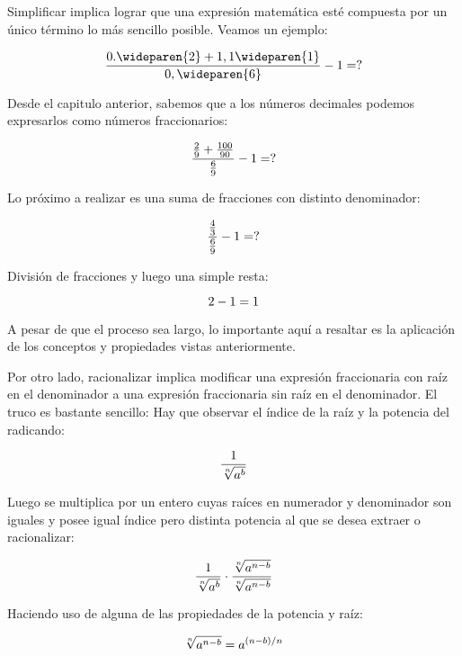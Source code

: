Simplificar implica lograr que una expresión matemática esté compuesta por un único término lo más sencillo posible. Veamos un ejemplo:

\begin{equation}
    \notag
    \frac{0.\wideparen{2}+1,1\wideparen{1}}{0,\wideparen{6}} -1 =?
\end{equation}

Desde el capitulo anterior, sabemos que a los números decimales podemos expresarlos como números fraccionarios:

\begin{equation}
    \notag
    \frac{\frac{2}{9}+\frac{100}{90}}{\frac{6}{9}}-1 =?
\end{equation}

Lo próximo a realizar es una suma de fracciones con distinto denominador: 

\begin{equation}
    \notag
    \frac{\frac{4}{3}}{\frac{6}{9}}-1 = ?
\end{equation}

División de fracciones y luego una simple resta:

\begin{equation}
    \notag
    2-1 = 1
\end{equation}

A pesar de que el proceso sea largo, lo importante aquí a resaltar es la aplicación de los conceptos y propiedades vistas anteriormente.

Por otro lado, racionalizar implica modificar una expresión fraccionaria con raíz en el denominador a una expresión fraccionaria sin raíz en el denominador. El truco es bastante sencillo: Hay que observar el índice de la raíz y la potencia del radicando:

\begin{equation}
    \notag
    \frac{1}{\sqrt[n]{a^b}}
\end{equation}

Luego se multiplica por un entero cuyas raíces en numerador y denominador son iguales y posee igual índice pero distinta potencia al que se desea extraer o racionalizar:

\begin{equation}
    \notag
    \frac{1}{\sqrt[n]{a^b}}\cdot \frac{\sqrt[n]{a^{n-b}}}{\sqrt[n]{a^{n-b}}}
\end{equation}

Haciendo uso de alguna de las propiedades de la potencia y raíz:


\begin{equation}
    \notag
   \sqrt[n]{a^{n-b}} = a^{(n-b)/n}
\end{equation}

